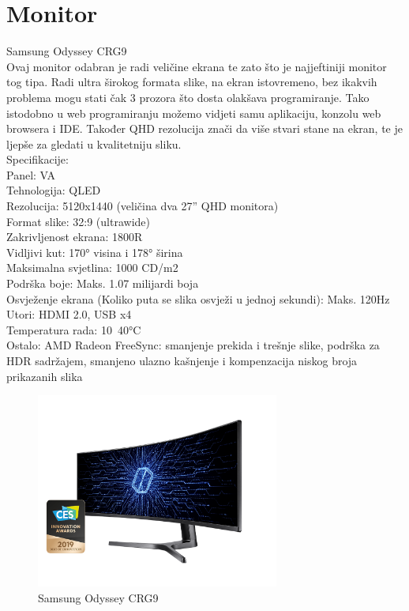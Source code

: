 \documentclass{report}
\begin{document}
\chapter{Monitor}
Samsung Odyssey CRG9
\\Ovaj monitor odabran je radi veličine ekrana te zato što je najjeftiniji monitor tog tipa. Radi ultra širokog formata slike, na ekran istovremeno, bez ikakvih problema mogu stati čak 3 prozora što dosta olakšava programiranje. Tako istodobno u web programiranju možemo vidjeti samu aplikaciju, konzolu web browsera i IDE. Također QHD rezolucija znači da više stvari stane na ekran, te je ljepše za gledati u kvalitetniju sliku.
\\Specifikacije:
\\Panel: VA
\\Tehnologija: QLED
\\Rezolucija: 5120x1440 (veličina dva 27” QHD monitora)
\\Format slike: 32:9 (ultrawide)
\\Zakrivljenost ekrana: 1800R
\\Vidljivi kut: 170° visina i 178° širina
\\Maksimalna svjetlina: 1000 CD/m2
\\Podrška boje: Maks. 1.07 milijardi boja
\\Osvježenje ekrana (Koliko puta se slika osvježi u jednoj sekundi): Maks. 120Hz
\\Utori: HDMI 2.0, USB x4
\\Temperatura rada: 10~40°C
\\Ostalo:
AMD Radeon FreeSync: smanjenje prekida i trešnje slike, podrška za HDR sadržajem, smanjeno ulazno kašnjenje i kompenzacija niskog broja prikazanih slika
\begin{figure}[h]
\includegraphics[width=8cm]{Monitor.png}
\caption{Samsung Odyssey CRG9}
\end{figure}
\end{document}
